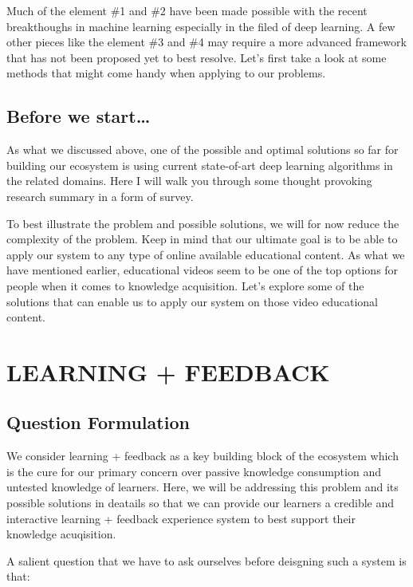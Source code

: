 \documentclass[]{book}
\theoremstyle{definition}
\theoremstyle{definition}
\theoremstyle{definition}
\theoremstyle{remark}
\begin{document}
Much of the element \#1 and \#2 have been made possible with the recent
breakthoughs in machine learning especially in the filed of deep
learning. A few other pieces like the element \#3 and \#4 may require a
more advanced framework that has not been proposed yet to best resolve.
Let's first take a look at some methods that might come handy when
applying to our problems.

\subsection{Before we start\ldots{}}\label{before-we-start}

As what we discussed above, one of the possible and optimal solutions so
far for building our ecosystem is using current state-of-art deep
learning algorithms in the related domains. Here I will walk you through
some thought provoking research summary in a form of survey.

To best illustrate the problem and possible solutions, we will for now
reduce the complexity of the problem. Keep in mind that our ultimate
goal is to be able to apply our system to any type of online available
educational content. As what we have mentioned earlier, educational
videos seem to be one of the top options for people when it comes to
knowledge acquisition. Let's explore some of the solutions that can
enable us to apply our system on those video educational content.

\section{LEARNING + FEEDBACK}\label{learning-feedback}

\subsection{Question Formulation}\label{question-formulation}

We consider learning + feedback as a key building block of the ecosystem
which is the cure for our primary concern over passive knowledge
consumption and untested knowledge of learners. Here, we will be
addressing this problem and its possible solutions in deatails so that
we can provide our learners a credible and interactive learning +
feedback experience system to best support their knowledge acuqisition.

A salient question that we have to ask ourselves before deisgning such a
system is that:
\end{document}
